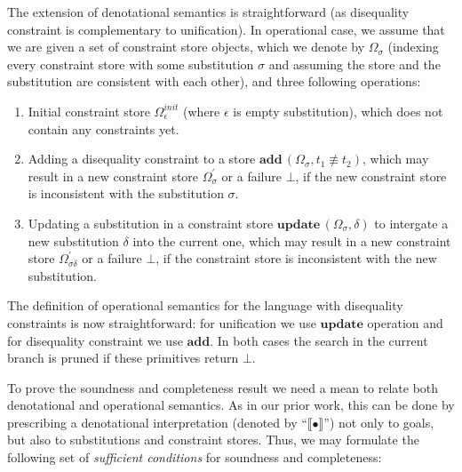 \documentclass[submission,copyright,creativecommons]{eptcs}
\newcommand{\sembr}[1]{\llbracket{#1}\rrbracket}
\newcommand{\diseq}{\not\equiv}
\newcommand{\reprfunset}{\mathcal{D}}
\newcommand{\cstore}{\Omega}
\newcommand{\cstoreinit}{\cstore_\epsilon^{init}}
\newcommand{\csadd}[3]{\mathbf{add}\,(#1, #2 \diseq #3)}  %
\newcommand{\csupdate}[2]{\mathbf{update}\,(#1, #2)}  %
\begin{document}
The extension of denotational semantics is straightforward (as disequality constraint is complementary to unification). In operational case,
we assume that we are given a set of constraint store objects, which we denote by $\cstore_\sigma$ (indexing every constraint store with
some substitution $\sigma$ and assuming the store and the substitution are consistent with each other), and three following operations:

\begin{enumerate}
\item Initial constraint store $\cstoreinit$ (where $\epsilon$ is empty substitution), which does not contain any constraints yet.
\item Adding a disequality constraint to a store $\csadd{\cstore_\sigma}{t_1}{t_2}$, which may result in a new constraint store $\cstore^\prime_\sigma$ or a failure $\bot$,
  if the new constraint store is inconsistent with the substitution $\sigma$.
\item Updating a substitution in a constraint store $\csupdate{\cstore_\sigma}{\delta}$ to intergate a new substitution $\delta$ into the current one,
  which may result in a new constraint store $\cstore^\prime_{\sigma \delta}$ or a failure $\bot$, if the constraint store is inconsistent with the new substitution.
\end{enumerate}

The definition of operational semantics for the language with disequality constraints is now straightforward: for unification we use $\mathbf{update}$ operation and for
disequality constraint we use $\mathbf{add}$. In both cases the search in the current branch is pruned if these primitives return $\bot$.

To prove the soundness and completeness result we need a mean to relate both denotational and operational semantics. As in our prior work, this can be done
by prescribing a denotational interpretation (denoted by ``$\sembr{\bullet}$'') not only to goals, but also to substitutions and constraint stores. Thus, we
may formulate the following set of \emph{sufficient conditions} for soundness and completeness:

\end{document}
